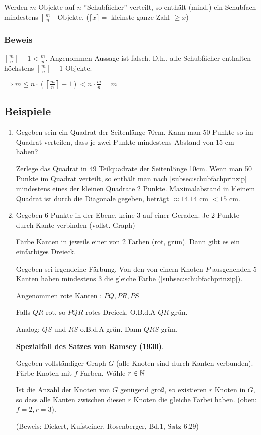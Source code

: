 Werden $m$ Objekte auf $n$ ''Schubfächer'' verteilt, so enthält (mind.) ein Schubfach mindestens $\left\lceil\frac{m}{n}\right\rceil$ Objekte. ($\lceil x \rceil = $ kleinste ganze Zahl $\geq x$)

\subsubsection*{Beweis}

$\left\lceil \frac{m}{n} \right\rceil - 1 < \frac{m}{n}$.
Angenommen Aussage ist falsch. D.h.. alle Schubfächer enthalten höchstens $\left\lceil \frac{m}{n} \right\rceil -1$ Objekte.

$\Rightarrow m \leq n \cdot \left(\left\lceil \frac{m}{n} \right\rceil -1\right) < n \cdot \frac{m}{n} = m $ %


\subsection[Beispiel: Anwendung Schubfachprinzip]{Beispiele} 

\begin{enumerate}
	\item Gegeben sein ein Quadrat der Seitenlänge 70cm. Kann man 50 Punkte so im Quadrat verteilen, dass je zwei Punkte mindestens Abstand von 15 cm haben?
	
	Zerlege das Quadrat in 49 Teilquadrate der Seitenlänge 10cm. Wenn man 50 Punkte im Quadrat verteilt, so enthält man nach \ref{subsec:schubfachprinzip} mindestens eines der kleinen Quadrate 2 Punkte.
	Maximalabstand in kleinem Quadrat ist durch die Diagonale gegeben, beträgt $\approx 14.14$ cm $< 15$ cm.
	
	\item
	Gegeben 6 Punkte in der Ebene, keine 3 auf einer Geraden. Je 2 Punkte durch Kante verbinden (vollst. Graph)
	
	Färbe Kanten in jeweils einer von 2 Farben (rot, grün).
	Dann gibt es ein einfarbiges Dreieck. 
	
	Gegeben sei irgendeine Färbung. Von den von einem Knoten $P$ ausgehenden 5 Kanten haben mindestens 3 die gleiche Farbe (\ref{subsec:schubfachprinzip}).
	
	Angenommen rote Kanten : $PQ, PR, PS$
	
	Falls $QR$ rot, so $PQR$ rotes Dreieck. O.B.d.A $QR$ grün.
	
	Analog: $QS$ und $RS$ o.B.d.A grün. Dann $QRS$ grün.
	
	\textbf{Spezialfall des Satzes von Ramsey (1930)}.
	
	Gegeben vollständiger Graph $G$ (alle Knoten sind durch Kanten verbunden).
	Färbe Knoten mit $f$ Farben. Wähle $r \in \operatorname{\mathbb{N}}$
	
	Ist die Anzahl der Knoten von $G$ genügend groß, so existieren $r$ Knoten in $G$, so dass alle Kanten zwischen diesen $r$ Knoten die gleiche Farbei haben.
	(oben: $f=2, r=3$).
	
	(Beweis: Diekert, Kufsteiner, Rosenberger, Bd.1, Satz 6.29)
	
	
\end{enumerate}


